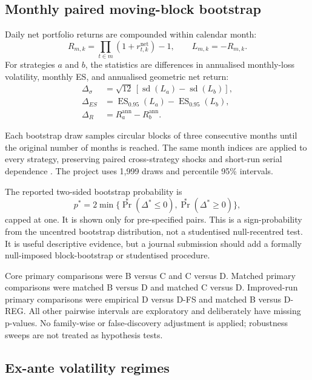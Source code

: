 \documentclass[11pt,a4paper]{article}
\newcommand{\ES}{\operatorname{ES}}
\begin{document}
\subsection{Monthly paired moving-block bootstrap}

Daily net portfolio returns are compounded within calendar month:
\begin{equation}
 R_{m,k}=\prod_{t\in m}(1+r^{\text{net}}_{t,k})-1,
 \qquad L_{m,k}=-R_{m,k}.
\end{equation}
For strategies $a$ and $b$, the statistics are differences in annualised monthly-loss volatility, monthly ES, and annualised geometric net return:
\begin{align}
 \Delta_\sigma&=\sqrt{12}\,[\operatorname{sd}(L_a)-\operatorname{sd}(L_b)],\\
 \Delta_{ES}&=\ES_{0.95}(L_a)-\ES_{0.95}(L_b),\\
 \Delta_R&=R^{\text{ann}}_a-R^{\text{ann}}_b.
\end{align}

Each bootstrap draw samples circular blocks of three consecutive months until the original number of months is reached. The same month indices are applied to every strategy, preserving paired cross-strategy shocks and short-run serial dependence \cite{kunsch1989}. The project uses 1,999 draws and percentile 95\% intervals.

The reported two-sided bootstrap probability is
\begin{equation}
 p^*=2\min\{\Pr^*(\Delta^*\le0),\Pr^*(\Delta^*\ge0)\},
 \label{eq:bootstrap-p}
\end{equation}
capped at one. It is shown only for pre-specified pairs. This is a sign-probability from the uncentred bootstrap distribution, not a studentised null-recentred test. It is useful descriptive evidence, but a journal submission should add a formally null-imposed block-bootstrap or studentised procedure.

Core primary comparisons were B versus C and C versus D. Matched primary comparisons were matched B versus D and matched C versus D. Improved-run primary comparisons were empirical D versus D-FS and matched B versus D-REG. All other pairwise intervals are exploratory and deliberately have missing p-values. No family-wise or false-discovery adjustment is applied; robustness sweeps are not treated as hypothesis tests.

\subsection{Ex-ante volatility regimes}
\end{document}
